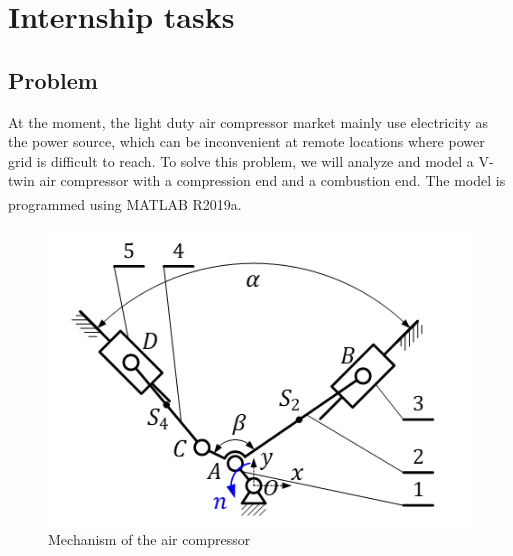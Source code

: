 \chapter{Internship tasks}

\section{Problem}
At the moment, the light duty air compressor market mainly use electricity as the power source, which can be inconvenient at remote locations where power grid is difficult to reach. To solve this problem, we will analyze and model a V-twin air compressor with a compression end and a combustion end. The model is programmed using MATLAB\textsuperscript{\textregistered} R2019a.
\begin{figure}[ht]
	\centering
	\includegraphics[width=0.6\linewidth]{03}
	\caption{Mechanism of the air compressor}
	\label{fig:03}
\end{figure}
